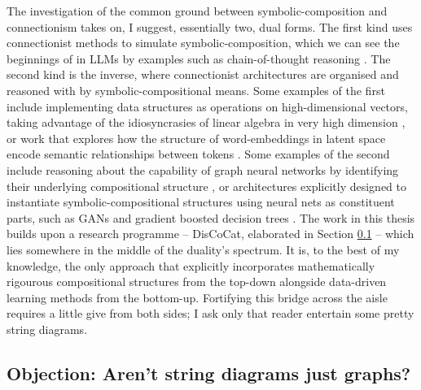 The investigation of the common ground between symbolic-composition and connectionism takes on, I suggest, essentially two, dual forms. The first kind uses connectionist methods to simulate symbolic-composition, which we can see the beginnings of in LLMs by examples such as chain-of-thought reasoning \cite{}. The second kind is the inverse, where connectionist architectures are organised and reasoned with by symbolic-compositional means. Some examples of the first include implementing data structures as operations on high-dimensional vectors, taking advantage of the idiosyncrasies of linear algebra in very high dimension \citep{}, or work that explores how the structure of word-embeddings in latent space encode semantic relationships between tokens \citep{}. Some examples of the second include reasoning about the capability of graph neural networks by identifying their underlying compositional structure \citep{}, or architectures explicitly designed to instantiate symbolic-compositional structures using neural nets as constituent parts, such as GANs \citep{} and gradient boosted decision trees \citep{}. The work in this thesis builds upon a research programme -- DisCoCat, elaborated in Section \ref{} -- which lies somewhere in the middle of the duality's spectrum. It is, to the best of my knowledge, the only approach that explicitly incorporates mathematically rigourous compositional structures from the top-down alongside data-driven learning methods from the bottom-up. Fortifying this bridge across the aisle requires a little give from both sides; I ask only that reader entertain some pretty string diagrams.

\subsection{\textbf{Objection:} Aren't string diagrams just graphs?}


